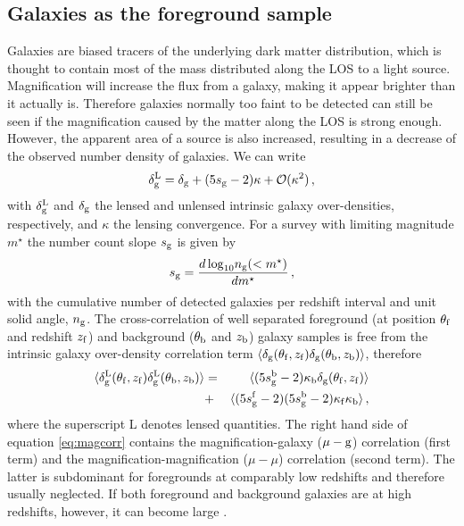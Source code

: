 \documentclass[useAMS,usenatbib]{mnras}
\newcommand{\be}{\begin{equation}}
\newcommand{\ee}{\end{equation}}
\newcommand{\bea}{\begin{eqnarray}}
\newcommand{\eea}{\end{eqnarray}}
\begin{document}
\subsection{Galaxies as the foreground sample}

Galaxies are biased tracers of the underlying dark matter distribution, which is thought to contain most of the mass distributed along the LOS to a light source. Magnification will increase the flux from a galaxy, making it appear brighter than it actually is. Therefore galaxies normally too faint to be detected can still be seen if the magnification caused by the matter along the LOS is strong enough. However, the apparent area of a source is also increased, resulting in a decrease of the observed number density of galaxies. We can write \citep{2006MNRAS.367..169Z}
\be
\delta^{\rm L}_{\rm g}=\delta_{\rm g}+(5s_{\rm g}-2)\kappa +\mathcal{O}(\kappa^2) \, ,
\ee with $\delta_{\rm g}^{\rm L}$ and $\delta_{\rm g}$ the lensed and unlensed intrinsic galaxy over-densities, respectively, and $\kappa$ the lensing convergence. For a survey with limiting magnitude $m^\star$ the number count slope $s_{\rm g}$ is given by \citep{Duncan:2013haa}
\be
\label{eq:sg}
s_{\rm g} = \frac{d{\rm \, log}_{10}n_{\rm g}(< m^\star)}{dm^\star} \, ,
\ee
with the cumulative number of detected galaxies per redshift interval and unit solid angle, $n_{\rm g}$.
The cross-correlation of well separated foreground (at position $\theta_{\rm f}$ and redshift $z_{\rm f}$) and background ($\theta_{\rm b}$ and $z_{\rm b}$) galaxy samples is free from the intrinsic galaxy over-density correlation term $\langle \delta_{\rm g}(\theta_{\rm f},z_{\rm f}) \delta_{\rm g}(\theta_{\rm b},z_{\rm b}) \rangle$, therefore
\bea
\label{eq:magcorr}
\langle \delta^{\rm L}_{\rm g}(\theta_{\rm f},z_{\rm f}) \delta^{\rm L}_{\rm g}(\theta_{\rm b},z_{\rm b}) \rangle
&=& \langle(5s^{\rm b}_{\rm g}-2) \kappa_{\rm b}  \delta_{\rm g}(\theta_{\rm f},z_{\rm f}) \rangle \nonumber \\
&+& \langle(5s^{\rm f}_{\rm g}-2)(5s^{\rm b}_{\rm g}-2)  \kappa_{\rm f} \kappa_{\rm b} \rangle \, ,
\eea
where the superscript {\rm L} denotes lensed quantities. The right hand side of equation \ref{eq:magcorr} contains the magnification-galaxy ($\mu-\rm g$) correlation (first term) and the magnification-magnification ($\mu-\mu$) correlation (second term). The latter is subdominant for foregrounds at comparably low redshifts and therefore usually neglected. If both foreground and background galaxies are at high redshifts, however, it can become large \citep{2008PhRvD..78l3517Z}.
\end{document}
